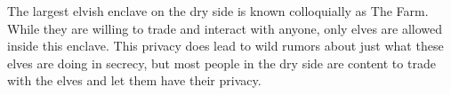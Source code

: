 The largest elvish enclave on the dry side is known colloquially as The Farm.
While they are willing to trade and interact with anyone, only elves are allowed inside this enclave.
This privacy does lead to wild rumors about just what these elves are doing in secrecy, but most people in the dry side are content to trade with the elves and let them have their privacy.
